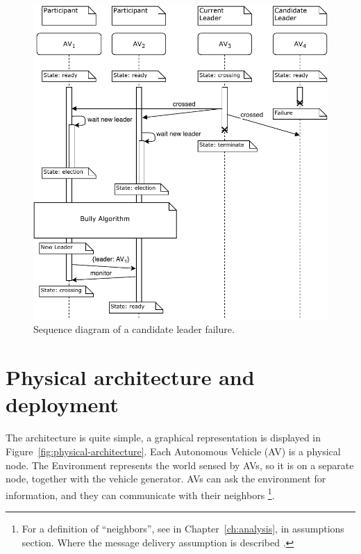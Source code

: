 \documentclass{memoir}
\begin{document}
\begin{figure}
	\centering
	\includegraphics[width=\linewidth]{sequence_diagrams/candidate_failure.pdf}
	\caption{Sequence diagram of a candidate leader failure.}
	\label{fig:seq-diag-candidate-failure}
\end{figure}

\section{Physical architecture and deployment}
The architecture is quite simple, a graphical representation is displayed in Figure~\ref{fig:physical-architecture}. Each Autonomous Vehicle (AV) is a physical node. The Environment represents the world sensed by AVs, so it is on a separate node, together with the vehicle generator. AVs can ask the environment for information, and they can communicate with their neighbors \footnote{For a definition of ``neighbors'', see in Chapter~\ref{ch:analysis}, in assumptions section. Where the message delivery assumption is described .}.
\end{document}
